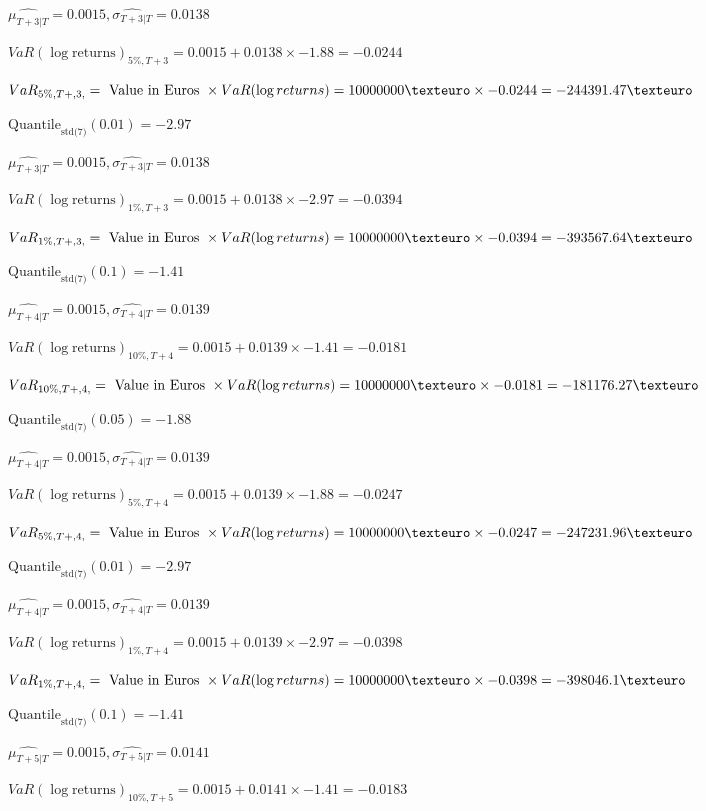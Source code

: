 $\hat{\mu_{T+3|T}} = 0.0015, \hat{\sigma_{T+3|T}} = 0.0138$

$VaR(\log \text{returns})_{5\%, T + 3} = 0.0015 + 0.0138\times-1.88 = -0.0244$

$VaR_{5\%, T + ,3,} = \text{ Value in Euros } \times VaR(\log returns) = 10 000 000 \texteuro \times-0.0244 = -244391.47 \texteuro$


$\text{Quantile}_\text{std(7)}(0.01) = -2.97$

$\hat{\mu_{T+3|T}} = 0.0015, \hat{\sigma_{T+3|T}} = 0.0138$

$VaR(\log \text{returns})_{1\%, T + 3} = 0.0015 + 0.0138\times-2.97 = -0.0394$

$VaR_{1\%, T + ,3,} = \text{ Value in Euros } \times VaR(\log returns) = 10 000 000 \texteuro \times-0.0394 = -393567.64 \texteuro$


$\text{Quantile}_\text{std(7)}(0.1) = -1.41$

$\hat{\mu_{T+4|T}} = 0.0015, \hat{\sigma_{T+4|T}} = 0.0139$

$VaR(\log \text{returns})_{10\%, T + 4} = 0.0015 + 0.0139\times-1.41 = -0.0181$

$VaR_{10\%, T + ,4,} = \text{ Value in Euros } \times VaR(\log returns) = 10 000 000 \texteuro \times-0.0181 = -181176.27 \texteuro$


$\text{Quantile}_\text{std(7)}(0.05) = -1.88$

$\hat{\mu_{T+4|T}} = 0.0015, \hat{\sigma_{T+4|T}} = 0.0139$

$VaR(\log \text{returns})_{5\%, T + 4} = 0.0015 + 0.0139\times-1.88 = -0.0247$

$VaR_{5\%, T + ,4,} = \text{ Value in Euros } \times VaR(\log returns) = 10 000 000 \texteuro \times-0.0247 = -247231.96 \texteuro$


$\text{Quantile}_\text{std(7)}(0.01) = -2.97$

$\hat{\mu_{T+4|T}} = 0.0015, \hat{\sigma_{T+4|T}} = 0.0139$

$VaR(\log \text{returns})_{1\%, T + 4} = 0.0015 + 0.0139\times-2.97 = -0.0398$

$VaR_{1\%, T + ,4,} = \text{ Value in Euros } \times VaR(\log returns) = 10 000 000 \texteuro \times-0.0398 = -398046.1 \texteuro$


$\text{Quantile}_\text{std(7)}(0.1) = -1.41$

$\hat{\mu_{T+5|T}} = 0.0015, \hat{\sigma_{T+5|T}} = 0.0141$

$VaR(\log \text{returns})_{10\%, T + 5} = 0.0015 + 0.0141\times-1.41 = -0.0183$

